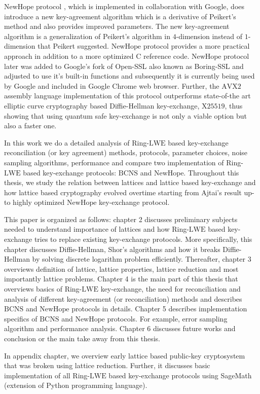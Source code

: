 $\mathrm{NewHope}$ protocol \cite{alkim2015post}, which is implemented in collaboration with Google, does introduce a new key-agreement algorithm which is a derivative of Peikert's method and also provides improved parameters. The new key-agreement algorithm is a generalization of Peikert's algorithm in $4$-dimension instead of $1$-dimension that Peikert suggested. $\mathrm{NewHope}$ protocol provides a more practical approach in addition to a more optimized $\mathrm{C}$ reference code. $\mathrm{NewHope}$ protocol later was added to Google's fork of Open-SSL also known as Boring-SSL and adjusted to use it's built-in functions and subsequently it is currently being used by Google and included in Google Chrome web browser. Further, the $\mathrm{AVX2}$ assembly language implementation of this protocol outperforms state-of-the art elliptic curve cryptography based Diffie-Hellman key-exchange, $\mathrm{X25519}$, thus showing that using quantum safe key-exchange is not only a viable option but also a faster one.

In this work we do a detailed analysis of Ring-$\mathrm{LWE}$ based key-exchange reconciliation (or key agreement) methods, protocols, parameter choices, noise sampling algorithms, performance and compare two implementation of Ring-$\mathrm{LWE}$ based key-exchange protocols: $\mathrm{BCNS}$ and $\mathrm{NewHope}$. Throughout this thesis, we study the relation between lattices and lattice based key-exchange and how lattice based cryptography evolved overtime starting from Ajtai's result up-to highly optimized $\mathrm{NewHope}$ key-exchange protocol.  

This paper is organized as follows: chapter 2 discusses preliminary subjects needed to understand importance of lattices and how Ring-$\mathrm{LWE}$ based key-exchange tries to replace existing key-exchange protocols. More specifically, this chapter discusses Diffie-Hellman, Shor's algorithms and how it breaks Diffie-Hellman by solving discrete logarithm problem efficiently. Thereafter, chapter 3 overviews definition of lattice, lattice properties, lattice reduction and most importantly lattice problems. Chapter 4 is the main part of this thesis that overviews basics of Ring-$\mathrm{LWE}$ key-exchange, the need for reconciliation and analysis of different key-agreement (or reconciliation) methods and describes $\mathrm{BCNS}$ and $\mathrm{NewHope}$ protocols in details. Chapter 5 describes implementation specifics of $\mathrm{BCNS}$ and $\mathrm{NewHope}$ protocols. For example, error sampling algorithm and performance analysis. Chapter 6 discusses future works and conclusion or the main take away from this thesis.

In appendix chapter, we overview early lattice based public-key cryptosystem that was broken using lattice reduction. Further, it discusses basic implementation of all Ring-$\mathrm{LWE}$ based key-exchange protocols using SageMath (extension of Python programming language). 